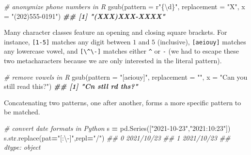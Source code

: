 \documentclass[
  12pt,
  krantz2]{krantz}
\makeatletter
\newenvironment{Shaded}{\begin{snugshade}}{\end{snugshade}}
\newcommand{\AttributeTok}[1]{\textcolor[rgb]{0.61,0.61,0.61}{#1}}
\newcommand{\BuiltInTok}[1]{#1}
\newcommand{\CommentTok}[1]{\textcolor[rgb]{0.37,0.37,0.37}{\textit{#1}}}
\newcommand{\DocumentationTok}[1]{\textcolor[rgb]{0.37,0.37,0.37}{\textbf{\textit{#1}}}}
\newcommand{\FunctionTok}[1]{\textcolor[rgb]{0,0,0}{#1}}
\newcommand{\NormalTok}[1]{#1}
\newcommand{\OperatorTok}[1]{\textcolor[rgb]{0.43,0.43,0.43}{\textbf{#1}}}
\newcommand{\StringTok}[1]{\textcolor[rgb]{0.5,0.5,0.5}{#1}}
\newenvironment{kframe}{%
\medskip{}
\setlength{\fboxsep}{.8em}
 \def\at@end@of@kframe{}%
 \ifinner\ifhmode%
  \def\at@end@of@kframe{\end{minipage}}%
  \begin{minipage}{\columnwidth}%
 \fi\fi%
 \def\FrameCommand##1{\hskip\@totalleftmargin \hskip-\fboxsep
 \colorbox{shadecolor}{##1}\hskip-\fboxsep
     \hskip-\linewidth \hskip-\@totalleftmargin \hskip\columnwidth}%
 \MakeFramed {\advance\hsize-\width
   \@totalleftmargin\z@ \linewidth\hsize
   \@setminipage}}%
 {\par\unskip\endMakeFramed%
 \at@end@of@kframe}
\renewenvironment{Shaded}{\begin{kframe}}{\end{kframe}}
\makeatother
\begin{document}
\begin{Shaded}
\begin{Highlighting}[]
\CommentTok{\# anonymize phone numbers in R}
\FunctionTok{gsub}\NormalTok{(}\AttributeTok{pattern =}\NormalTok{ r}\StringTok{"\{\textbackslash{}d\}"}\NormalTok{, }\AttributeTok{replacement =} \StringTok{"X"}\NormalTok{, }\AttributeTok{x =} \StringTok{"(202)555{-}0191"}\NormalTok{)}
\DocumentationTok{\#\# [1] "(XXX)XXX{-}XXXX"}
\end{Highlighting}
\end{Shaded}

\begin{Shaded}
\end{Shaded}

Many character classes feature an opening and closing square brackets. For instance, \texttt{{[}1-5{]}} matches any digit between \(1\) and \(5\) (inclusive), \texttt{{[}aeiouy{]}} matches any lowercase vowel, and \texttt{{[}\textbackslash{}\^{}\textbackslash{}-{]}} matches either \texttt{\^{}} or \texttt{-} (we had to escape these two metacharacters because we are only interested in the literal pattern).

\begin{Shaded}
\begin{Highlighting}[]
\CommentTok{\# remove vowels in R}
\FunctionTok{gsub}\NormalTok{(}\AttributeTok{pattern =} \StringTok{"[aeiouy]"}\NormalTok{, }\AttributeTok{replacement =} \StringTok{""}\NormalTok{, }
     \AttributeTok{x =} \StringTok{"Can you still read this?"}\NormalTok{)}
\DocumentationTok{\#\# [1] "Cn  stll rd ths?"}
\end{Highlighting}
\end{Shaded}

Concatenating two patterns, one after another, forms a more specific pattern to be matched.

\begin{Shaded}
\begin{Highlighting}[]
\CommentTok{\# convert date formats in Python}
\NormalTok{s }\OperatorTok{=}\NormalTok{ pd.Series([}\StringTok{"2021{-}10{-}23"}\NormalTok{,}\StringTok{"2021:10:23"}\NormalTok{])}
\NormalTok{s.}\BuiltInTok{str}\NormalTok{.replace(pat}\OperatorTok{=}\StringTok{"[:\textbackslash{}{-}]"}\NormalTok{,repl}\OperatorTok{=}\StringTok{"/"}\NormalTok{)}
\CommentTok{\#\# 0    2021/10/23}
\CommentTok{\#\# 1    2021/10/23}
\CommentTok{\#\# dtype: object}
\end{Highlighting}
\end{Shaded}
\end{document}
